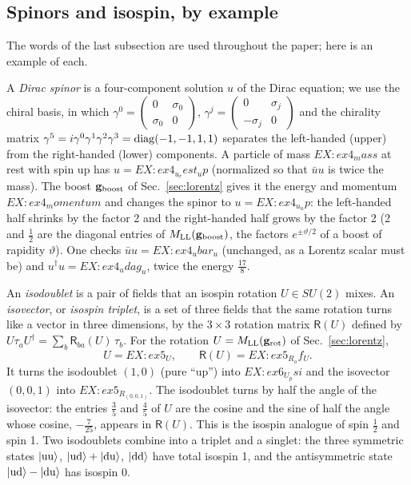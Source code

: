 \documentclass[aps,prd,twocolumn,superscriptaddress,nofootinbib,floatfix,longbibliography]{revtex4-2}
\newcommand{\LL}{{\rm LL}}
\begin{document}
\subsection{Spinors and isospin, by example}
\label{sec:spinors}

The words of the last subsection are used throughout the paper; here is an example of each.

A \emph{Dirac spinor} is a four-component solution $u$ of the Dirac equation; we use the chiral basis, in which
$\gamma^0=\left(\begin{smallmatrix}0&\sigma_0\\\sigma_0&0\end{smallmatrix}\right)$,
$\gamma^j=\left(\begin{smallmatrix}0&\sigma_j\\-\sigma_j&0\end{smallmatrix}\right)$ and the chirality matrix
$\gamma^5=i\gamma^0\gamma^1\gamma^2\gamma^3={\rm diag}(-1,-1,1,1)$ separates the left-handed (upper) from the
right-handed (lower) components. A particle of mass ${{EX:ex4_mass}}$ at rest with spin up has $u={{EX:ex4_u_rest_up}}$
(normalized so that $\bar uu$ is twice the mass). The boost $\mathbf g_{\rm boost}$ of Sec.~\ref{sec:lorentz} gives it the energy and momentum
${{EX:ex4_momentum}}$ and changes the spinor to $u={{EX:ex4_u_up}}$: the left-handed half shrinks by the factor 2 and the
right-handed half grows by the factor 2 (2 and $\frac12$ are the diagonal entries of $M_\LL(\mathbf g_{\rm boost})$, the
factors $e^{\pm\vartheta/2}$ of a boost of rapidity $\vartheta$). One checks $\bar uu={{EX:ex4_ubar_u}}$
(unchanged, as a Lorentz scalar must be) and $u^\dagger u={{EX:ex4_udag_u}}$, twice the energy $\frac{17}8$.

An \emph{isodoublet} is a pair of fields that an isospin rotation $U\in SU(2)$ mixes. An \emph{isovector}, or
\emph{isospin triplet}, is a set of three fields that the same rotation turns like a vector in three dimensions, by the
$3\times3$ rotation matrix $\mathsf R(U)$ defined by $U\tau_aU^\dagger=\sum_b\mathsf R_{ba}(U)\,\tau_b$. For the rotation
$U=M_\LL(\mathbf g_{\rm rot})$ of Sec.~\ref{sec:lorentz},
\begin{equation}
U={{EX:ex5_U}},\qquad \mathsf R(U)={{EX:ex5_R_of_U}}.
\label{eq:UR}
\end{equation}
It turns the isodoublet $(1,0)$ (pure ``up'') into ${{EX:ex6_U_psi}}$ and the isovector $(0,0,1)$ into
${{EX:ex5_R_(0,0,1)}}$. The isodoublet turns by half the angle of the isovector: the entries $\frac35$ and $\frac45$ of $U$
are the cosine and the sine of half the angle whose cosine, $-\frac7{25}$, appears in $\mathsf R(U)$. This is the isospin analogue
of spin $\frac12$ and spin 1. Two isodoublets combine into a triplet and a singlet: the three symmetric states $|{\rm uu}\rangle$,
$|{\rm ud}\rangle+|{\rm du}\rangle$, $|{\rm dd}\rangle$ have total isospin 1, and the antisymmetric state
$|{\rm ud}\rangle-|{\rm du}\rangle$ has isospin 0.
\end{document}
